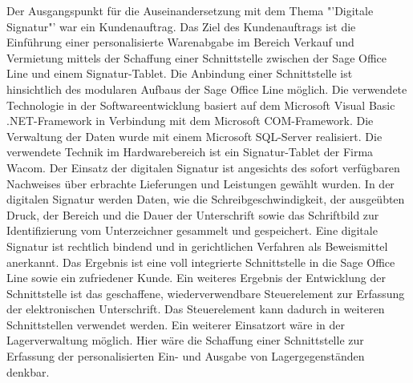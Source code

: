 Der Ausgangspunkt für die Auseinandersetzung mit dem Thema "'Digitale Signatur"' war ein Kundenauftrag. Das Ziel des Kundenauftrags ist die Einführung einer personalisierte Warenabgabe im Bereich Verkauf und Vermietung mittels der Schaffung einer Schnittstelle zwischen der Sage Office Line und einem Signatur-Tablet.
\newline
Die Anbindung einer Schnittstelle ist hinsichtlich des modularen Aufbaus der Sage Office Line möglich. Die verwendete Technologie in der Softwareentwicklung basiert auf dem Microsoft Visual Basic .NET-Framework in Verbindung mit dem Microsoft COM-Framework. Die Verwaltung der Daten wurde mit einem Microsoft SQL-Server realisiert. Die verwendete Technik im Hardwarebereich ist ein Signatur-Tablet der Firma Wacom. Der Einsatz der digitalen Signatur ist angesichts des sofort verfügbaren Nachweises über erbrachte Lieferungen und Leistungen gewählt wurden. In der digitalen Signatur werden Daten, wie die Schreibgeschwindigkeit, der ausgeübten Druck, der Bereich und die Dauer der Unterschrift sowie das Schriftbild zur Identifizierung vom Unterzeichner gesammelt und gespeichert. Eine digitale Signatur ist rechtlich bindend und in gerichtlichen Verfahren als Beweismittel anerkannt. 
\newline
Das Ergebnis ist eine voll integrierte Schnittstelle in die Sage Office Line sowie ein zufriedener Kunde. Ein weiteres Ergebnis der Entwicklung der Schnittstelle ist das geschaffene, wiederverwendbare Steuerelement zur Erfassung der elektronischen Unterschrift. Das Steuerelement kann dadurch in weiteren Schnittstellen verwendet werden. Ein weiterer Einsatzort wäre in der Lagerverwaltung möglich. Hier wäre die Schaffung  einer Schnittstelle zur Erfassung der personalisierten Ein- und Ausgabe von Lagergegenständen denkbar.